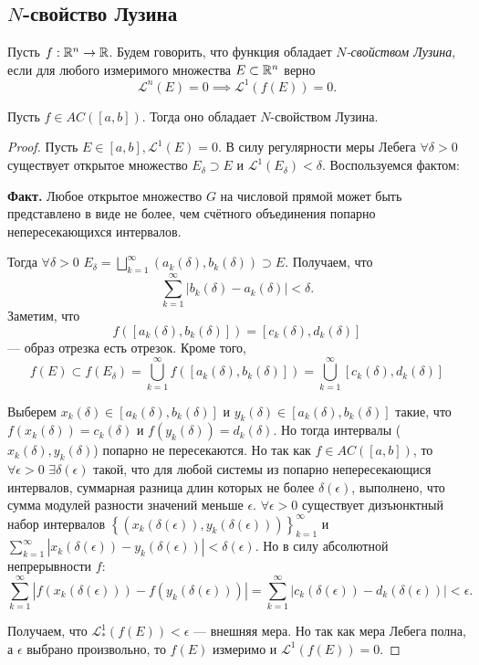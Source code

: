 \subsection{$N$-свойство Лузина}
\begin{definition}
    Пусть $f: \mathbb{R}^n \to \mathbb{R}$. Будем говорить, что функция обладает \textit{$N$-свойством Лузина}, если для любого измеримого множества $E \subset \mathbb{R}^n$ верно 
    $$\mathcal{L}^n(E) = 0 \implies \mathcal{L}^1(f(E))=0.$$
\end{definition} 

\begin{theorem}
    Пусть $f \in AC([a,b])$. Тогда оно обладает $N$-свойством Лузина.
\end{theorem} 
\begin{proof}
    Пусть $E \in[a, b], \mathcal{L}^1(E)=0$. В силу регулярности меры Лебега $\forall \delta>0$ существует открытое множество $E_\delta \supset E$ и $\mathcal{L}^1\left(E_\delta\right)<\delta$.
    Воспользуемся фактом:

    \noindent\textbf{Факт.} Любое открытое множество $G$ на числовой прямой может быть представлено в виде не более, чем счётного объединения попарно непересекающихся интервалов.

    Тогда $\forall \delta>0$ $E_\delta=\bigsqcup_{k=1}^{\infty}\left(a_k(\delta), b_k(\delta)\right) \supset E$. Получаем, что 
    $$\sum_{k=1}^{\infty}\left|b_k(\delta)-a_k(\delta)\right|<\delta.$$
    Заметим, что 
    $$f\left(\left[a_k(\delta), b_k(\delta)\right]\right)=\left[c_k(\delta), d_k(\delta)\right]$$ 
    — образ отрезка есть отрезок. Кроме того,
    $$
    f(E) \subset f\left(E_\delta\right)=\bigcup_{k=1}^{\infty} f\left(\left[a_k(\delta), b_k(\delta)\right]\right)=\bigcup_{k=1}^{\infty}\left[c_k(\delta), d_k(\delta)\right]
    $$

    Выберем $x_k(\delta) \in\left[a_k(\delta), b_k(\delta)\right]$ и $y_k(\delta) \in\left[a_k(\delta), b_k(\delta)\right]$ такие, что $f\left(x_k(\delta)\right)=c_k(\delta)$ и $f\left(y_k(\delta)\right)=d_k(\delta)$. 
    Но тогда интервалы ($x_k(\delta), y_k(\delta)$) попарно не пересекаются. Но так как $f \in A C([a, b])$, то $\forall \epsilon>0$ $\exists \delta(\epsilon)$ такой, что для любой системы из попарно непересекающися интервалов, суммарная разница длин которых не более $\delta(\epsilon)$, выполнено, что сумма модулей разности значений меньше $\epsilon$. $\forall \epsilon>0$ существует дизъюнктный набор интервалов $\left\{\left(x_k(\delta(\epsilon)), y_k(\delta(\epsilon))\right)\right\}_{k=1}^{\infty}$ и $\sum_{k=1}^{\infty}\left|x_k(\delta(\epsilon))-y_k(\delta(\epsilon))\right|<\delta(\epsilon)$. Но в силу абсолютной непрерывности $f$:
    $$
    \sum_{k=1}^{\infty}\left|f\left(x_k(\delta(\epsilon))\right)-f\left(y_k(\delta(\epsilon))\right)\right|=\sum_{k=1}^{\infty}\left|c_k(\delta(\epsilon))-d_k(\delta(\epsilon))\right|<\epsilon .
    $$

    Получаем, что $\mathcal{L}_*^1(f(E))<\epsilon$ — внешняя мера. Но так как мера Лебега полна, а $\epsilon$ выбрано произвольно, то $f(E)$ измеримо и $\mathcal{L}^1(f(E))=0$.
\end{proof} 


